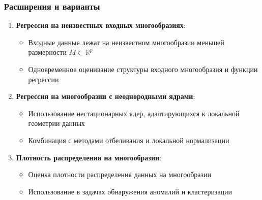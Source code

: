 \documentclass[a4paper,12pt]{article}
\begin{document}
\subsubsection{Расширения и варианты}

\begin{enumerate}
    \item \textbf{Регрессия на неизвестных входных многообразиях}:
    \begin{itemize}
        \item Входные данные лежат на неизвестном многообразии меньшей размерности $M \subset \mathbb{R}^p$
        \item Одновременное оценивание структуры входного многообразия и функции регрессии
    \end{itemize}

    \item \textbf{Регрессия на многообразии с неоднородными ядрами}:
    \begin{itemize}
        \item Использование нестационарных ядер, адаптирующихся к локальной геометрии данных
        \item Комбинация с методами отбеливания и локальной нормализации
    \end{itemize}

    \item \textbf{Плотность распределения на многообразии}:
    \begin{itemize}
        \item Оценка плотности распределения данных на многообразии
        \item Использование в задачах обнаружения аномалий и кластеризации
    \end{itemize}
\end{enumerate}
\end{document}
